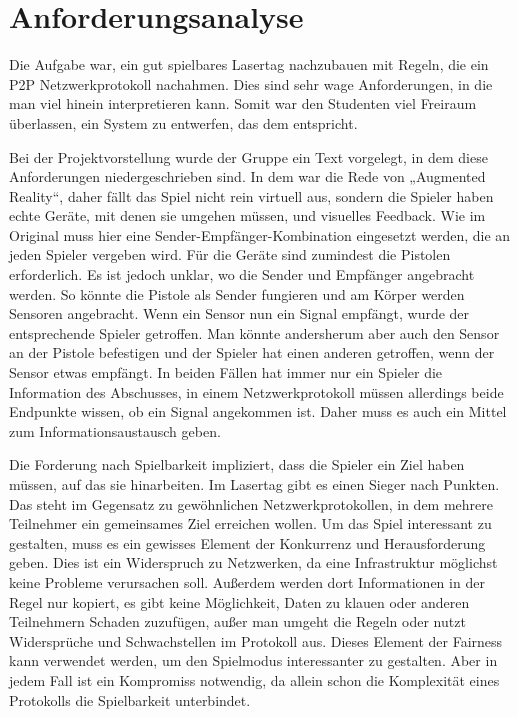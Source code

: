 \section{Anforderungsanalyse}
\label{sec:anforderungsanalyse}

Die Aufgabe war, ein gut spielbares Lasertag nachzubauen mit Regeln, die ein
P2P Netzwerkprotokoll nachahmen. Dies sind sehr wage Anforderungen, in die man
viel hinein interpretieren kann. Somit war den Studenten viel Freiraum
überlassen, ein System zu entwerfen, das dem entspricht.

Bei der Projektvorstellung wurde der Gruppe ein Text vorgelegt, in dem diese
Anforderungen niedergeschrieben sind. In dem war die Rede von 
„Augmented Reality“, daher fällt das Spiel nicht rein virtuell aus, sondern
die Spieler haben echte Geräte, mit denen sie umgehen müssen, und visuelles
Feedback. Wie im Original muss hier eine Sender-Empfänger-Kombination
eingesetzt werden, die an jeden Spieler vergeben wird. Für die Geräte sind
zumindest die Pistolen erforderlich. Es ist jedoch unklar, wo die Sender und
Empfänger angebracht werden. So könnte die Pistole als Sender fungieren und
am Körper werden Sensoren angebracht. Wenn ein Sensor nun ein Signal empfängt,
wurde der entsprechende Spieler getroffen. Man könnte andersherum aber auch
den Sensor an der Pistole befestigen und der Spieler hat einen anderen
getroffen, wenn der Sensor etwas empfängt. In beiden Fällen hat immer nur ein
Spieler die Information des Abschusses, in einem Netzwerkprotokoll müssen
allerdings beide Endpunkte wissen, ob ein Signal angekommen ist. Daher muss
es auch ein Mittel zum Informationsaustausch geben.

Die Forderung nach Spielbarkeit impliziert, dass die Spieler ein Ziel haben
müssen, auf das sie hinarbeiten. Im Lasertag gibt es einen Sieger nach Punkten.
Das steht im Gegensatz zu gewöhnlichen Netzwerkprotokollen, in dem mehrere
Teilnehmer ein gemeinsames Ziel erreichen wollen. Um das Spiel interessant zu
gestalten, muss es ein gewisses Element der Konkurrenz und Herausforderung geben.
Dies ist ein Widerspruch zu Netzwerken, da eine Infrastruktur möglichst
keine Probleme verursachen soll. Außerdem werden dort
Informationen in der Regel nur kopiert, es gibt keine Möglichkeit, Daten zu
klauen oder anderen Teilnehmern Schaden zuzufügen, außer man umgeht die Regeln
oder nutzt Widersprüche und Schwachstellen im Protokoll aus.
Dieses Element der Fairness kann verwendet werden, um den Spielmodus
interessanter zu gestalten. Aber in jedem Fall ist ein Kompromiss notwendig,
da allein schon die Komplexität eines Protokolls die Spielbarkeit unterbindet.

